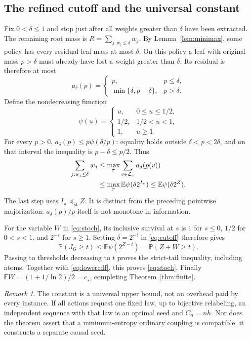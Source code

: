 \documentclass[11pt,a4paper]{article}
\theoremstyle{definition}\newtheorem{definition}[theorem]{Definition}
\theoremstyle{remark}\newtheorem{remark}[theorem]{Remark}
\newcommand{\E}{\mathbb E}
\newcommand{\Pp}{\mathbb P}
\newcommand{\st}{\preceq_{\mathrm{st}}}
\numberwithin{equation}{section}
\begin{document}
\subsection{The refined cutoff and the universal constant}
Fix $0<\delta\le1$ and stop just after all weights greater than $\delta$
have been extracted. The remaining root mass is
$R=\sum_{j:w_j\le\delta}w_j$. By Lemma~\ref{lem:minimax}, some policy has
every residual leaf mass at most $\delta$. On this policy a leaf with
original mass $p>\delta$ must already have lost a weight greater than
$\delta$. Its residual is therefore at most
\[
 a_\delta(p)=\begin{cases}
 p,&p\le\delta,\\
 \min\{\delta,p-\delta\},&p>\delta.
 \end{cases}
\]
Define the nondecreasing function
\[
 \psi(u)=\begin{cases}
 u,&0\le u\le1/2,\\
 1/2,&1/2<u<1,\\
 1,&u\ge1.
 \end{cases}
\]
For every $p>0$, $a_\delta(p)\le p\psi(\delta/p)$: equality holds
outside $\delta<p<2\delta$, and on that interval the inequality is
$p-\delta\le p/2$. Thus
\begin{align}
 \sum_{j:w_j\le\delta}w_j
 &\le\max_\pi\sum_{v\in\mathcal L_\pi}a_\delta(p(v))\notag\\
 &\le\max_\pi\E\psi(\delta2^{I_\pi})
 \le\E\psi(\delta2^Z).\label{eq:cutoff}
\end{align}
The last step uses $I_\pi\st Z$. It is distinct from the preceding
pointwise majorization: $a_\delta(p)/p$ itself is not monotone in information.

For the variable $W$ in \eqref{eq:stoch}, its inclusive survival at $s$ is
$1$ for $s\le0$, $1/2$ for $0<s<1$, and $2^{-s}$ for $s\ge1$.
Setting $\delta=2^{-t}$ in \eqref{eq:cutoff} therefore gives
\[
 \Pp(J_G\ge t)\le\E\psi(2^{Z-t})=\Pp(Z+W\ge t).
\]
Passing to thresholds decreasing to $t$ proves the strict-tail inequality,
including atoms. Together with \eqref{eq:lowercdf}, this proves
\eqref{eq:stoch}. Finally
$\E W=(1+1/\ln2)/2=c_\star$, completing
Theorem~\ref{thm:finite}.

\begin{remark}
The constant is a universal upper bound, not an overhead paid by every
instance. If all actions request one fixed law, up to bijective
relabeling, an independent sequence with that law is an optimal seed and
$C_n=nh$. Nor does the theorem assert that a minimum-entropy ordinary
coupling is compatible; it constructs a separate causal seed.
\end{remark}
\end{document}
